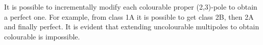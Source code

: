 
It is possible to incrementally modify each colourable proper (2,3)-pole to obtain a perfect one. For example, from class 1A it is possible to get class 2B, then 2A and finally perfect. It is evident that extending uncolourable multipoles to obtain colourable is impossible.
